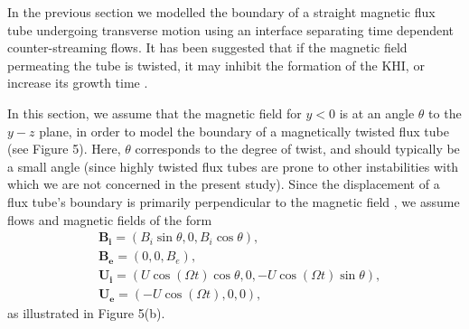 \documentclass[12pt]{ociamthesis}
\begin{document}
In the previous section we modelled the boundary of a straight magnetic flux tube undergoing transverse motion using an interface separating time dependent counter-streaming flows.
It has been suggested that if the magnetic field permeating the tube is twisted, it may inhibit the formation of the KHI, or increase its growth time \citep{Terradas2008}.

In this section, we assume that the magnetic field for $y < 0$ is at an angle $\theta$ to the $y-z$ plane, in order to model the boundary of a magnetically twisted flux tube (see Figure 5).
Here, $\theta$ corresponds to the degree of twist, and should typically be a small angle (since highly twisted flux tubes are prone to other instabilities with which we are not concerned in the present study).
Since the displacement of a flux tube's boundary is primarily perpendicular to the magnetic field \citep[see, for example,][]{Ruderman2008}, we assume flows and magnetic fields of the form
\begin{align*}
& \mathbf{B_i} = (B_i \sin \theta, 0, B_i \cos \theta),
\\[0.3cm]
& \mathbf{B_e} = (0, 0, B_e),
\\[0.3cm]
& \mathbf{U_i} = (U \cos(\Omega t) \cos \theta, 0, - U \cos(\Omega t) \sin \theta),
\\[0.3cm]
& \mathbf{U_e} = (- U \cos(\Omega t), 0, 0),
\end{align*}
as illustrated in Figure 5(b).
\end{document}
